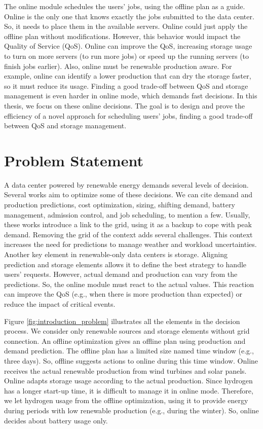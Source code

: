 The online module schedules the users' jobs, using the offline plan as a guide. Online is the only one that knows exactly the jobs submitted to the data center. So, it needs to place them in the available servers. Online could just apply the offline plan without modifications. However, this behavior would impact the Quality of Service (QoS). Online can improve the QoS, increasing storage usage to turn on more servers (to run more jobs) or speed up the running servers (to finish jobs earlier). Also, online must be renewable production aware. For example, online can identify a lower production that can dry the storage faster, so it must reduce its usage. Finding a good trade-off between QoS and storage management is even harder in online mode, which demands fast decisions. In this thesis, we focus on these online decisions. The goal is to design and prove the efficiency of a novel approach for scheduling users' jobs, finding a good trade-off between QoS and storage management.

\section{Problem Statement}

A data center powered by renewable energy demands several levels of decision. Several works aim to optimize some of these decisions. We can cite demand and production predictions, cost optimization, sizing, shifting demand, battery management, admission control, and job scheduling, to mention a few. Usually, these works introduce a link to the grid, using it as a backup to cope with peak demand. Removing the grid of the context adds several challenges. This context increases the need for predictions to manage weather and workload uncertainties. Another key element in renewable-only data centers is storage. Aligning prediction and storage elements allows it to define the best strategy to handle users' requests. However, actual demand and production can vary from the predictions. So, the online module must react to the actual values. This reaction can improve the QoS (e.g., when there is more production than expected) or reduce the impact of critical events.

Figure \ref{fig:introduction_problem} illustrates all the elements in the decision process. We consider only renewable sources and storage elements without grid connection. An offline optimization gives an offline plan using production and demand prediction. The offline plan has a limited size named time window (e.g., three days). So, offline suggests actions to online during this time window. Online receives the actual renewable production from wind turbines and solar panels. Online adapts storage usage according to the actual production. Since hydrogen has a longer start-up time, it is difficult to manage it in online mode. Therefore, we let hydrogen usage from the offline optimization, using it to provide energy during periods with low renewable production (e.g., during the winter). So, online decides about battery usage only. 

